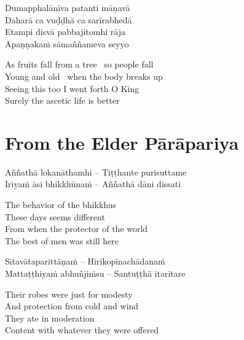 \begin{twochants}
  Dumapphalānīva patanti māṇavā\\
  Daharā ca vuḍḍhā ca sarīrabhedā\\
  Etampi disvā pabbajitomhi rāja\\
  Apaṇṇakaṁ sāmaññameva seyyo
\end{twochants}

\begin{english}
  As fruits fall from a tree \breathmark\ so people fall\\
  Young and old \breathmark\ when the body breaks up\\
  Seeing this too I went forth O King\\
  Surely the ascetic life is better
\end{english}

\suttaRef{[Thag 16.4 / MN 82]}


\section{From the Elder Pārāpariya}
\label{parapariya}

\begin{leader}
\end{leader}

\begin{twochants}
  Aññathā lokanāthamhi – Tiṭṭhante purisuttame\\
  Iriyaṁ āsi bhikkhūnaṁ – Aññathā dāni dissati\\
\end{twochants}

\begin{english}
  The behavior of the bhikkhus\\
  These days seems different\\
  From when the protector of the world\\
  The best of men was still here
\end{english}

\begin{twochants}
  Sītavātaparittāṇaṁ – Hirikopīnachādanaṁ\\
  Mattaṭṭhiyaṁ abhuñjiṁsu – Santuṭṭhā itarītare\\
\end{twochants}

\begin{english}
  Their robes were just for modesty\\
  And protection from cold and wind\\
  They ate in moderation\\
  Content with whatever they were offered
\end{english}

